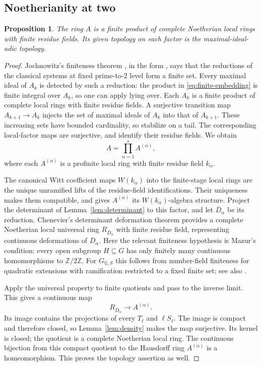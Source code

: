\documentclass[11pt]{article}
\newtheorem{proposition}[theorem]{Proposition}
\theoremstyle{remark}
\numberwithin{equation}{section}
\newcommand{\Z}{\mathbb Z}
\newcommand{\Q}{\mathbb Q}
\begin{document}
\subsection{Noetherianity at two}
\begin{proposition}\label{prop:noetherian}
The ring $A$ is a finite product of complete Noetherian local rings
with finite residue fields. Its given topology on each factor is
the maximal-ideal-adic topology.
\end{proposition}
\begin{proof}
Jochnowitz's finiteness theorem \cite{Jochnowitz82}, in the form
\cite[Proposition~2.8]{Emerton11}, says that the reductions of the
classical systems at fixed prime-to-$2$ level form a finite set.
Every maximal ideal of $A_k$ is detected by such a reduction:
the product in \eqref{eq:finite-embedding} is finite integral over
$A_k$, so one can apply lying over. Each $A_k$ is a finite product
of complete local rings with finite residue fields. A surjective
transition map $A_{k+1}\to A_k$ injects the set of maximal ideals
of $A_k$ into that of $A_{k+1}$. These increasing sets have bounded
cardinality, so stabilize on a tail. The corresponding local-factor
maps are surjective, and identify their residue fields. We obtain
\[
 A=\prod_{\alpha=1}^s A^{(\alpha)},
\]
where each $A^{(\alpha)}$ is a profinite local ring with finite
residue field $k_\alpha$.

The canonical Witt coefficient maps $W(k_\alpha)$ into the
finite-stage local rings are the unique unramified lifts of the
residue-field identifications. Their uniqueness makes them
compatible, and gives $A^{(\alpha)}$ its $W(k_\alpha)$-algebra
structure. Project the determinant of
Lemma~\ref{lem:determinant} to this factor, and let
$\overline D_\alpha$ be its reduction. Chenevier's determinant
deformation theorem \cite[Propositions~3.3 and~3.7]{Chenevier14}
provides a complete Noetherian local universal ring
$R_{\overline D_\alpha}$ with finite residue field, representing
continuous deformations of $\overline D_\alpha$. Here the relevant
finiteness hypothesis is Mazur's condition: every open subgroup
$H\subseteq G$ has only finitely many continuous homomorphisms to
$\Z/2\Z$. For $G_{\Q,S}$ this follows from number-field finiteness
for quadratic extensions with ramification restricted to a fixed
finite set; see also \cite[Example~3.6]{Chenevier14}.

Apply the universal property to finite quotients and pass to the
inverse limit. This gives a continuous map
\[
 R_{\overline D_\alpha}\longrightarrow A^{(\alpha)}.
\]
Its image contains the projections of every $T_\ell$ and
$\ell S_\ell$. The image is compact and therefore closed, so
Lemma~\ref{lem:density} makes the map surjective. Its kernel is
closed; the quotient is a complete Noetherian local ring. The
continuous bijection from this compact quotient to the Hausdorff
ring $A^{(\alpha)}$ is a homeomorphism. This proves the topology
assertion as well.
\end{proof}
\end{document}
